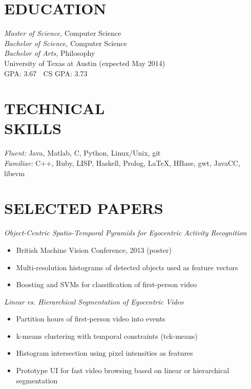 \documentclass[line,margin]{res}
\begin{document}
\address{\textbf{email:} tomas.mccandless@gmail.com, \textbf{phone:} (210) 232-1477} 
\address{\textbf{web:} tomasmccandless.com}

 
\begin{resume}
 
 
\section{EDUCATION} {\sl Master of Science,} Computer Science \\
                    {\sl Bachelor of Science,} Computer Science \\
										{\sl Bachelor of Arts,} Philosophy \\
                University of Texas at Austin 
                (expected May 2014) \\
								GPA: 3.67  $\;$ CS GPA: 3.73 
 
\section{TECHNICAL \\ SKILLS} {\sl Fluent:} Java, Matlab, C, Python, Linux/Unix, git \\
                {\sl Familiar:} C++, Ruby, LISP, Haskell, Prolog, \LaTeX, HBase, gwt, JavaCC, libsvm \\


                              \section{SELECTED PAPERS} {\sl Object-Centric Spatio-Temporal Pyramids for Egocentric Activity Recognition}
	\begin{itemize} \itemsep -2pt
  \item British Machine Vision Conference, 2013 (poster)
	\item Multi-resolution histograms of detected objects used as feature vectors
	\item Boosting and SVMs for classification of first-person video
	\end{itemize}


 {\sl Linear vs. Hierarchical Segmentation of Egocentric Video} 
	\begin{itemize} \itemsep -2pt
	\item Partition hours of first-person video into events 
	\item k-means clustering with temporal constraints (tck-means)
	\item Histogram intersection using pixel intensities as features
	\item Prototype UI for fast video browsing based on linear or hierarchical segmentation
	\end{itemize}


\end{resume}
\end{document}
